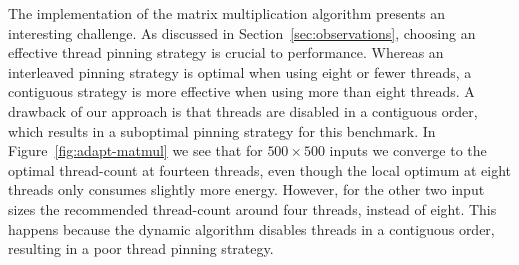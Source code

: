 The \sac{} implementation of the matrix multiplication algorithm presents an interesting challenge.
As discussed in Section~\ref{sec:observations}, choosing an effective thread pinning strategy is
crucial to performance. Whereas an interleaved pinning strategy is optimal when using eight or fewer
threads, a contiguous strategy is more effective when using more than eight threads. A drawback of
our approach is that threads are disabled in a contiguous order, which results in a suboptimal
pinning strategy for this benchmark. In Figure~\ref{fig:adapt-matmul} we see that for $500 \times
500$ inputs we converge to the optimal thread-count at fourteen threads, even though the local
optimum at eight threads only consumes slightly more energy. However, for the other two input sizes
the recommended thread-count around four threads, instead of eight. This happens because the dynamic
algorithm disables threads in a contiguous order, resulting in a poor thread pinning strategy.

